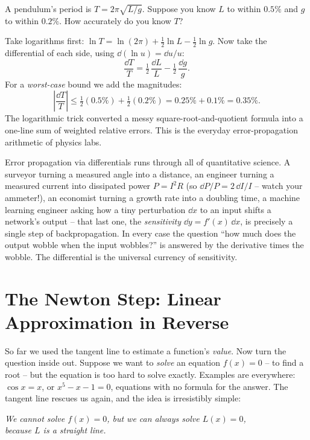 \begin{example}
\label{ch14:ex-combine}
A pendulum's period is $T = 2\pi\sqrt{L/g}$. Suppose you know $L$ to within
$0.5\%$ and $g$ to within $0.2\%$. How accurately do you know $T$?

Take logarithms first: $\ln T = \ln(2\pi) + \tfrac12\ln L - \tfrac12 \ln g$.
Now take the differential of each side, using $\dd(\ln u)=\dd u/u$:
\[
\frac{\dd T}{T} = \tfrac12\,\frac{\dd L}{L} - \tfrac12\,\frac{\dd g}{g}.
\]
For a \emph{worst-case} bound we add the magnitudes:
\[
\left|\frac{\dd T}{T}\right| \le \tfrac12(0.5\%) + \tfrac12(0.2\%)
= 0.25\% + 0.1\% = 0.35\%.
\]
The logarithmic trick converted a messy square-root-and-quotient formula into a
one-line sum of weighted relative errors. This is the everyday error-propagation
arithmetic of physics labs.
\end{example}

\begin{applicationbox}
Error propagation via differentials runs through all of quantitative science.
A surveyor turning a measured angle into a distance, an engineer turning a
measured current into dissipated power $P=I^2R$ (so $\dd P/P = 2\,\dd I/I$ -- watch
your ammeter!), an economist turning a growth rate into a doubling time, a machine
learning engineer asking how a tiny perturbation $\dd x$ to an input shifts a
network's output -- that last one, the \emph{sensitivity} $\dd y = f'(x)\,\dd x$,
is precisely a single step of backpropagation. In every case the question ``how
much does the output wobble when the input wobbles?'' is answered by the
derivative times the wobble. The differential is the universal currency of
sensitivity.
\end{applicationbox}

\section{The Newton Step: Linear Approximation in Reverse}
\label{ch14:newton}

So far we used the tangent line to estimate a function's \emph{value}. Now turn
the question inside out. Suppose we want to \emph{solve} an equation $f(x)=0$ --
to find a root -- but the equation is too hard to solve exactly. Examples are
everywhere: $\cos x = x$, or $x^5 - x - 1 = 0$, equations with no formula for the
answer. The tangent line rescues us again, and the idea is irresistibly simple:

\begin{center}
\emph{We cannot solve $f(x)=0$, but we can always solve $L(x)=0$,\\ because $L$
is a straight line.}
\end{center}

